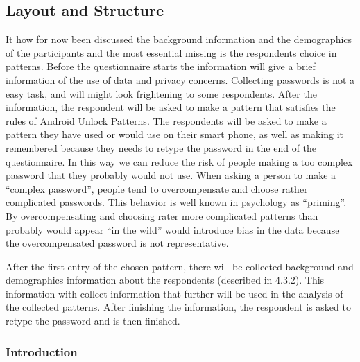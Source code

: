   
  \clearpage
  \subsection{Layout and Structure}

    It how for now been discussed the background information and the demographics of the participants and the most essential missing is the respondents choice in patterns. Before the questionnaire starts the information will give a brief information of the use of data and privacy concerns. Collecting passwords is not a easy task, and will might look frightening to some respondents. After the information, the respondent will be asked to make a pattern that satisfies the rules of Android Unlock Patterns. The respondents will be asked to make a pattern they have used or would use on their smart phone, as well as making it remembered because they needs to retype the password in the end of the questionnaire. In this way we can reduce the risk of people making a too complex password that they probably would not use. When asking a person to make a ``complex password'', people tend to overcompensate and choose rather complicated passwords. This behavior is well known in psychology as ``priming''. By overcompensating and choosing rater more complicated patterns than probably would appear ``in the wild'' would introduce bias in the data because the overcompensated password is not representative. 

    After the first entry of the chosen pattern, there will be collected background and demographics information about the respondents (described in 4.3.2). This information with collect information that further will be used in the analysis of the collected patterns. After finishing the information, the respondent is asked to retype the password and is then finished.     

    \subsubsection*{Introduction}
